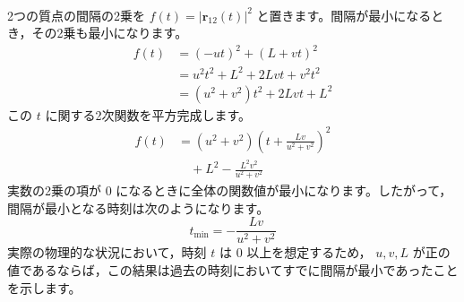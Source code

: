 \begin{solutionparts}
\begin{align*}
\end{align*}
2つの質点の間隔の2乗を $f(t) = |\boldsymbol{r}_{12}(t)|^2$ と置きます。間隔が最小になるとき，その2乗も最小になります。
\begin{align*}
f(t)
  &= (-ut)^2+(L+vt)^2 \\
  &= u^2t^2+L^2+2Lvt+v^2t^2 \\
  &= (u^2+v^2)t^2+2Lvt+L^2
\end{align*}
この $t$ に関する2次関数を平方完成します。
\begin{align*}
f(t)
  &= (u^2+v^2)
     \left(t+\frac{Lv}{u^2+v^2}\right)^2 \\
  &\quad +L^2-\frac{L^2v^2}{u^2+v^2}
\end{align*}
実数の2乗の項が 0 になるときに全体の関数値が最小になります。したがって，間隔が最小となる時刻は次のようになります。
\begin{equation*}
t_{\text{min}} = - \frac{Lv}{u^2 + v^2}
\end{equation*}
実際の物理的な状況において，時刻 $t$ は 0 以上を想定するため， $u, v, L$ が正の値であるならば，この結果は過去の時刻においてすでに間隔が最小であったことを示します。

\end{solutionparts}
